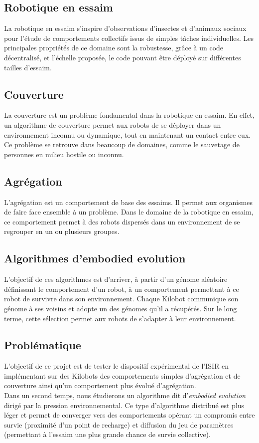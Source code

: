 \documentclass[a4paper]{article}
\begin{document}
\subsection{Robotique en essaim}
La robotique en essaim s'inspire d'observations d'insectes et d'animaux sociaux pour l'étude de comportements collectifs issus de simples tâches individuelles. Les principales propriétés de ce domaine sont la robustesse, grâce à un code décentralisé, et l'échelle proposée, le code pouvant être déployé sur différentes tailles d'essaim.
\subsection{Couverture}
La couverture est un problème fondamental dans la robotique en essaim. En effet, un algorithme de couverture permet aux robots de se déployer dans un environnement inconnu ou dynamique, tout en maintenant un contact entre eux. Ce problème se retrouve dans beaucoup de domaines, comme le sauvetage de personnes en milieu hostile ou inconnu.
\subsection{Agrégation}
L'agrégation est un comportement de base des essaims. Il permet aux organismes de faire face ensemble à un problème. Dans le domaine de la robotique en essaim, ce comportement permet à des robots dispersés dans un environnement de se regrouper en un ou plusieurs groupes.
\subsection{Algorithmes d'embodied evolution}
L'objectif de ces algorithmes est d'arriver, à partir d'un génome aléatoire définissant le comportement d'un robot, à un comportement permettant à ce robot de survivre dans son environnement. Chaque Kilobot communique son génome à ses voisins et adopte un des génomes qu'il a récupérés. Sur le long terme, cette sélection permet aux robots de s'adapter à leur environnement.
\subsection{Problématique}
L'objectif de ce projet est de tester le dispositif expérimental de  l'ISIR en implémentant sur des Kilobots des comportements simples d'agrégation et de couverture ainsi qu'un comportement plus évolué d'agrégation. 
\\Dans un second temps, nous étudierons un algorithme dit d'\textit{embodied evolution} dirigé par la pression environnemental. Ce type d'algorithme distribué est plus léger et permet de converger vers des comportements opérant un compromis entre survie (proximité d'un point de recharge) et diffusion du jeu de paramètres (permettant à l'essaim une plus grande chance de survie collective).
\newpage
\end{document}
